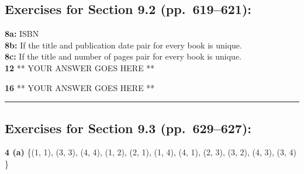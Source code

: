 \documentclass[12pt]{article}  %
\begin{document}
{{%

\subsection*{Exercises for Section 9.2 (pp.\ 619--621):}     

\noindent
{\bf 8a:} {\normalfont ISBN}
\\
{\bf 8b:} {\normalfont If the title and publication date pair for every book
is unique.}
\\
{\bf 8c:} {\normalfont If the title and number of pages pair for every book
is unique.}
\\
\noindent
{\bf 12}
** YOUR ANSWER GOES HERE **

\noindent
{\bf 16}
** YOUR ANSWER GOES HERE **

\rule{6in}{.1pt}       %


\subsection*{Exercises for Section 9.3 (pp.\ 629--627):}     

\noindent
{\bf 4 (a)} {\normalfont \{(1, 1), (3, 3), (4, 4), (1, 2), (2, 1), (1, 4), (4, 1), (2, 3), (3, 2), (4, 3), (3, 4) \}}

}}
\end{document}
